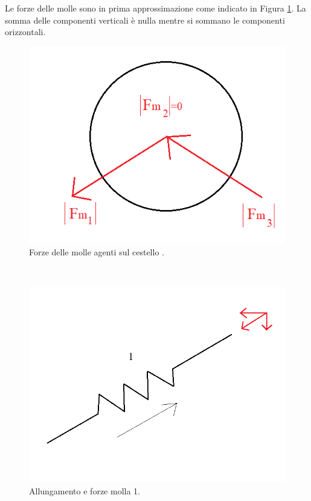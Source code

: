 Le forze delle molle sono in prima approssimazione come indicato in Figura \ref{ForzeMolle}. La somma delle componenti verticali è nulla mentre si sommano le componenti orizzontali. 
\begin{figure}[h]
    \centering
    \includegraphics[scale=0.5]{Immagini/LavatriceForze3Molle.png}
    \caption{Forze delle molle agenti sul cestello .}
    \label{ForzeMolle}
\end{figure}
\\
\begin{figure}[h]
    \centering
    \includegraphics[scale=0.4]{Immagini/Molla 1.png}
    \caption{Allungamento e forze molla 1.}
    \label{Molla1}
\end{figure}
